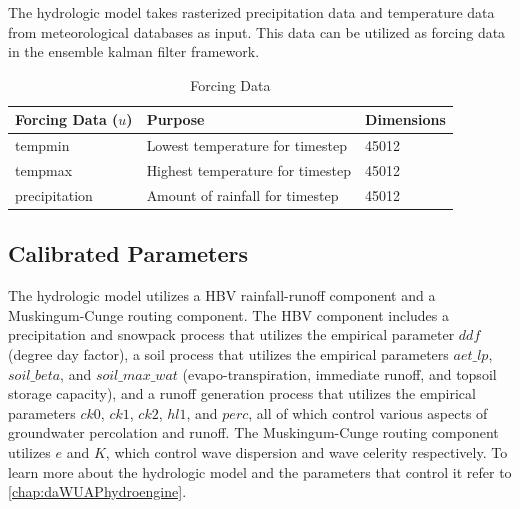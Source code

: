 The hydrologic model takes rasterized precipitation data and temperature data from meteorological databases as input. This data can be utilized as forcing data in the ensemble kalman filter framework.
\begin{table}[]
\caption{Forcing Data} 
\begin{tabular}{lll}
Forcing Data ($u$) & Purpose                          & Dimensions \\ \hline
tempmin          & Lowest temperature for timestep  & 45012 \\
tempmax          & Highest temperature for timestep & 45012 \\
precipitation      & Amount of rainfall for timestep & 45012 
\end{tabular}
\label{tab:u_params}
\end{table}

\subsection{Calibrated Parameters}

The hydrologic model utilizes a HBV rainfall-runoff component and a Muskingum-Cunge routing component. The HBV component includes a precipitation and snowpack process that utilizes the empirical parameter $ddf$ (degree day factor), a soil process that utilizes the empirical parameters $aet\_lp$, $soil\_beta$, and $soil\_max\_wat$ (evapo-transpiration, immediate runoff, and topsoil storage capacity), and a runoff generation process that utilizes the empirical parameters $ck0$, $ck1$, $ck2$, $hl1$, and $perc$, all of which control various aspects of groundwater percolation and runoff. The Muskingum-Cunge routing component utilizes $e$ and $K$, which control wave dispersion and wave celerity respectively. To learn more about the hydrologic model and the parameters that control it refer to \autoref{chap:daWUAPhydroengine}.

